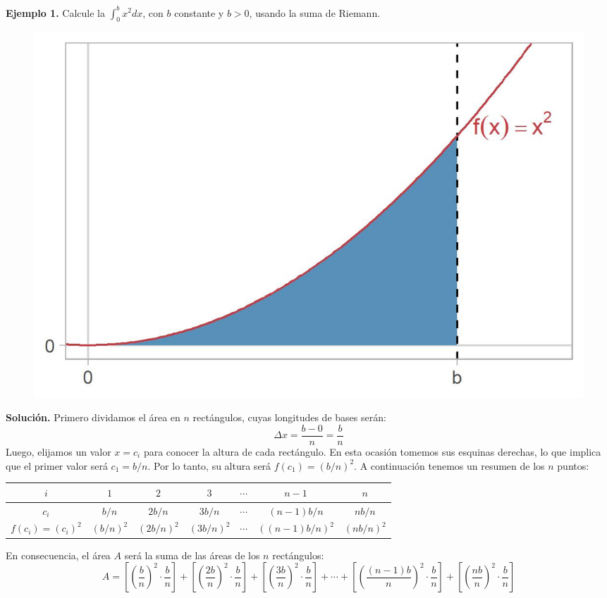 \documentclass[12pt]{article}
\begin{document}
\textbf{Ejemplo 1.} \quad Calcule la $\int_{0}^{b} x^{2} dx$, con $b$ constante y $b > 0$, usando la suma de Riemann.

\newpage

\begin{figure}[hbt!]
\centering
\includegraphics[scale = 0.7]{img/riemann_example-1.jpg}
\end{figure}

\textbf{Solución.} \quad Primero dividamos el área en $n$ rectángulos, cuyas longitudes de bases serán:
\[
  \Delta x = \frac{b - 0}{n} = \frac{b}{n}
\]
Luego, elijamos un valor $x = c_{i}$ para conocer la altura de cada rectángulo. En esta ocasión tomemos sus esquinas derechas, lo que implica que el primer valor será $c_{1} = b/n$. Por lo tanto, su altura será $f(c_{1}) = (b/n)^{2}$. A continuación tenemos un resumen de los $n$ puntos:

\begin{table}[hbt!]
\centering
\begin{tabular}{c|c c c c c c}
$i$ & $1$ & $2$ & $3$ & $\cdots$ & $n - 1$ & $n$ \\
\hline
$c_{i}$ & $b/n$ & $2b/n$ & $3b/n$ & $\cdots$ & $(n-1)b/n$ & $nb/n$ \\
\hline
$f(c_{i}) = (c_{i})^{2}$ & $(b/n)^{2}$ & $(2b/n)^{2}$ & $(3b/n)^{2}$ & $\cdots$ & $((n-1)b/n)^{2}$ & $(nb/n)^{2}$ 
\end{tabular}
\end{table}

En consecuencia, el área $A$ será la suma de las áreas de los $n$ rectángulos:
\[
  A = \left[\left(\frac{b}{n}\right)^{2} \cdot \frac{b}{n}\right] +
      \left[\left(\frac{2b}{n}\right)^{2} \cdot \frac{b}{n}\right] +
      \left[\left(\frac{3b}{n}\right)^{2} \cdot \frac{b}{n}\right] + \cdots +
      \left[\left(\frac{(n-1)b}{n}\right)^{2} \cdot \frac{b}{n}\right] +
      \left[\left(\frac{nb}{n}\right)^{2} \cdot \frac{b}{n}\right] 
\]
\end{document}
